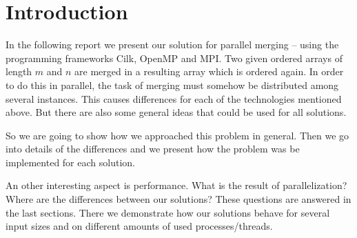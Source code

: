 \section{Introduction}
In the following report we present our solution for parallel merging – using the programming frameworks
Cilk,
OpenMP
and MPI.
Two given ordered arrays of length $m$ and $n$ are merged in a resulting array which is ordered again.
In order to do this in parallel, the task of merging must somehow be distributed among several instances.
This causes differences for each of the technologies mentioned above.
But there are also some general ideas that could be used for all solutions.

So we are going to show how we approached this problem in general.
Then we go into details of the differences and we present how the problem was be implemented for each solution.

An other interesting aspect is performance.
What is the result of parallelization?
Where are the differences between our solutions?
These questions are answered in the last sections.
There we demonstrate how our solutions behave for several input sizes and on different amounts of used processes/threads.
